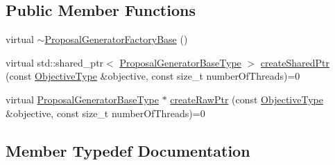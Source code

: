 \subsection*{Public Member Functions}
\begin{DoxyCompactItemize}
\item 
virtual \hyperlink{classnifty_1_1graph_1_1lifted__multicut_1_1ProposalGeneratorFactoryBase_a8b3dc6f87fad8ee7642c9e9e09a1c6ea}{$\sim$\+Proposal\+Generator\+Factory\+Base} ()
\item 
virtual std\+::shared\+\_\+ptr$<$ \hyperlink{classnifty_1_1graph_1_1lifted__multicut_1_1ProposalGeneratorFactoryBase_a26c563a0dc26559eca515d98ddbc0e8b}{Proposal\+Generator\+Base\+Type} $>$ \hyperlink{classnifty_1_1graph_1_1lifted__multicut_1_1ProposalGeneratorFactoryBase_a42364fe57e8d5be1f349e005cf86dbd0}{create\+Shared\+Ptr} (const \hyperlink{classnifty_1_1graph_1_1lifted__multicut_1_1ProposalGeneratorFactoryBase_a397bfdd5d71a4be8ff2b8e74eca08866}{Objective\+Type} \&objective, const size\+\_\+t number\+Of\+Threads)=0
\item 
virtual \hyperlink{classnifty_1_1graph_1_1lifted__multicut_1_1ProposalGeneratorFactoryBase_a26c563a0dc26559eca515d98ddbc0e8b}{Proposal\+Generator\+Base\+Type} $\ast$ \hyperlink{classnifty_1_1graph_1_1lifted__multicut_1_1ProposalGeneratorFactoryBase_a0c3aae42298c3184c484f00d36be427a}{create\+Raw\+Ptr} (const \hyperlink{classnifty_1_1graph_1_1lifted__multicut_1_1ProposalGeneratorFactoryBase_a397bfdd5d71a4be8ff2b8e74eca08866}{Objective\+Type} \&objective, const size\+\_\+t number\+Of\+Threads)=0
\end{DoxyCompactItemize}


\subsection{Member Typedef Documentation}
\hypertarget{classnifty_1_1graph_1_1lifted__multicut_1_1ProposalGeneratorFactoryBase_a397bfdd5d71a4be8ff2b8e74eca08866}{}
